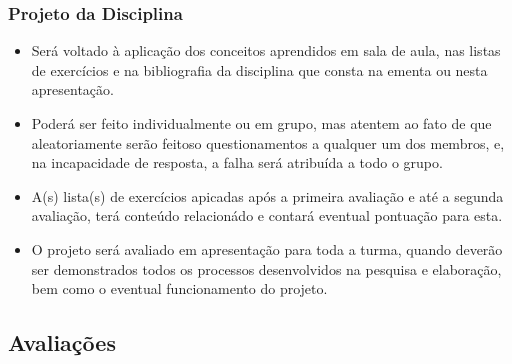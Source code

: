 \begin{frame}[t]\frametitle{Projeto da Disciplina}

  \begin{itemize}
    \justifying{}
    \setlength\itemsep{1em}
    \item Será voltado à aplicação dos conceitos aprendidos em sala de aula, nas listas de exercícios e na bibliografia da disciplina que consta na ementa ou nesta apresentação.
    \item Poderá ser feito individualmente ou em grupo, mas atentem ao fato de que aleatoriamente serão feitoso questionamentos a qualquer um dos membros, e, na incapacidade de resposta, a falha será atribuída a todo o grupo.
    \item A(s) lista(s) de exercícios apicadas após a primeira avaliação e até a segunda avaliação, terá conteúdo relacionádo e contará eventual pontuação para esta.
    \item O projeto será avaliado em apresentação para toda a turma, quando deverão ser demonstrados todos os processos desenvolvidos na pesquisa e elaboração, bem como o eventual funcionamento do projeto.
  \end{itemize}

\end{frame}



\subsection[Avaliações]{Avaliações}\label{subsec:sec03-avaliacoes}



